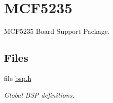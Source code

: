 \hypertarget{group__RTEMSBSPsM68kMCF5235}{}\section{M\+C\+F5235}
\label{group__RTEMSBSPsM68kMCF5235}


M\+C\+F5235 Board Support Package.  


\subsection*{Files}
\begin{DoxyCompactItemize}
\item 
file \mbox{\hyperlink{bsps_2m68k_2mcf5235_2include_2bsp_8h}{bsp.\+h}}
\begin{DoxyCompactList}\small\item\em Global B\+SP definitions. \end{DoxyCompactList}\end{DoxyCompactItemize}
